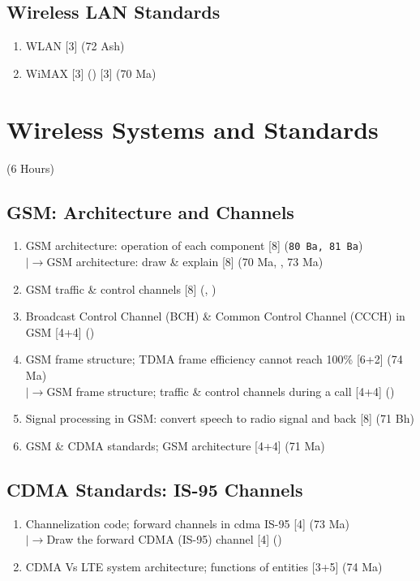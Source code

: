 \documentclass[12pt]{article}
\newcommand{\lb}{\\$\left|\rightarrow\right.$}
\begin{document}
  \subsection{Wireless LAN Standards}
    \begin{enumerate}[topsep=0pt, noitemsep]
      \item WLAN \hfill [3] (72 Ash)
      \item WiMAX \hfill [3] () [3] (70 Ma)
    \end{enumerate}

\pagebreak
\section{Wireless Systems and Standards}
\begin{center}(6 Hours)\end{center}

  \subsection{GSM: Architecture and Channels}
    \begin{enumerate}[topsep=0pt, noitemsep]
      \item GSM architecture: operation of each component \hfill [8] (\texttt{80 Ba, 81 Ba})
        \lb GSM architecture: draw \& explain \hfill [8] (70 Ma, , 73 Ma)
      \item GSM traffic \& control channels \hfill [8] (, )
      \item Broadcast Control Channel (BCH) \& Common Control Channel (CCCH) in GSM \hfill [4+4] ()
      \item GSM frame structure; TDMA frame efficiency cannot reach 100\% \hfill [6+2] (74 Ma)
        \lb GSM frame structure; traffic \& control channels during a call \hfill [4+4] ()
      \item Signal processing in GSM: convert speech to radio signal and back \hfill [8] (71 Bh)
      \item GSM \& CDMA standards; GSM architecture \hfill [4+4] (71 Ma)
    \end{enumerate}

  \subsection{CDMA Standards: IS-95 Channels}
    \begin{enumerate}[topsep=0pt, noitemsep]
      \item Channelization code; forward channels in cdma IS-95 \hfill [4] (73 Ma)
        \lb Draw the forward CDMA (IS-95) channel \hfill [4] ()
      \item CDMA Vs LTE system architecture; functions of entities \hfill [3+5] (74 Ma)
    \end{enumerate}
\end{document}
